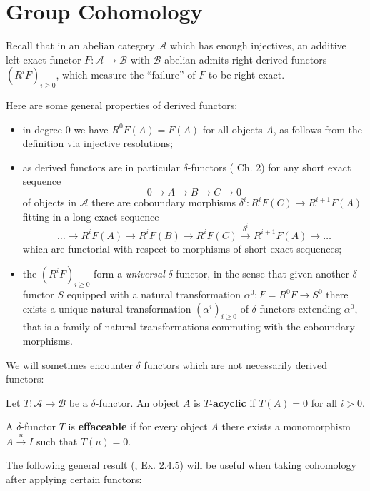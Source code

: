 \documentclass[a4paper, oneside]{memoir}
\begin{document}
\section{Group Cohomology}

Recall that in an abelian category $\mathcal{A}$ which has enough injectives, an additive left-exact functor $F:\mathcal{A}\to\mathcal{B}$ with $\mathcal{B}$ abelian admits right derived functors $(R^i F)_{i\geq 0}$, which measure the ``failure'' of $F$ to be right-exact.

\medskip \noindent Here are some general properties of derived functors:
\begin{itemize}
	\item in degree $0$ we have $R^0F(A)=F(A)$ for all objects $A$, as follows from the definition via injective resolutions;
	\item as derived functors are in particular $\delta$-functors (\cite{Weibel} Ch. 2)
	      for any short exact sequence
	      \[
		      0\to A\to B\to C\to 0
	      \]
	      of objects in $\mathcal{A}$ there are coboundary morphisms $\delta^i:R^iF(C)\to R^{i+1}F(A)$ fitting in a long exact sequence
	      \[
		      \ldots\to R^iF(A)\to R^iF(B)\to R^iF(C)\overset{\delta^i}{\to} R^{i+1}F(A)\to\ldots
	      \]
	      which are functorial with respect to morphisms of short exact sequences;
	\item the $(R^i F)_{i \geq 0}$ form a \textit{universal} $\delta$-functor, in the sense that given another $\delta$-functor $S$ equipped with a natural transformation $\alpha^0:F=R^0F\to S^0$ there exists a unique natural transformation $(\alpha^i)_{i\geq 0}$ of $\delta$-functors extending $\alpha^0$, that is a family of natural transformations commuting with the coboundary morphisms.
\end{itemize}

We will sometimes encounter $\delta$ functors which are not necessarily derived functors:
\begin{definition}
	Let $T:\mathcal{A}\to\mathcal{B}$ be a $\delta$-functor. An object $A$ is $T$-\textbf{acyclic} if $T(A)=0$ for all $i>0$.
\end{definition}

\begin{definition}
	A $\delta$-functor $T$ is \textbf{effaceable} if for every object $A$ there exists a monomorphism $A\overset{u}{\to} I$ such that $T(u)=0$.
\end{definition}

The following general result (\cite{Tohoku}, Ex. 2.4.5) will be useful when taking cohomology after applying certain functors:
\end{document}
